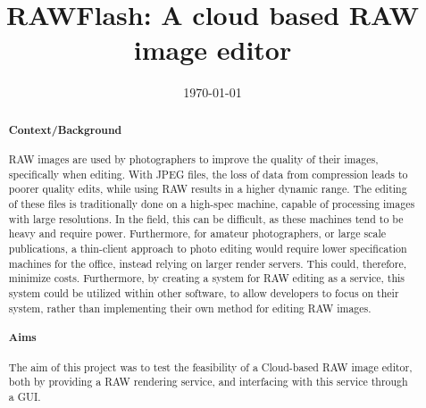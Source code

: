 \documentclass[10pt,a4paper]{article}
\title{RAWFlash: A cloud based RAW image editor}
\author{} %
\date{\today}
\begin{document}
\maketitle

\begin{abstract}

\paragraph{Context/Background}
RAW images are used by photographers to improve the quality of their images, specifically when editing. With JPEG files, the loss of data from compression leads to poorer quality edits, while using RAW results in a higher dynamic range. The editing of these files is traditionally done on a high-spec machine, capable of processing images with large resolutions. In the field, this can be difficult,
as these machines tend to be heavy and require power. Furthermore, for amateur photographers, or large scale publications,
a thin-client approach to photo editing would require lower specification machines for the office, instead relying on larger render
servers. This could, therefore, minimize costs. Furthermore, by creating a system for RAW editing as a service,
this system could be utilized within other software, to allow developers to focus on their system, rather than implementing their own method for editing RAW images.


\paragraph{Aims}
The aim of this project was to test the feasibility of a Cloud-based RAW image editor, both by providing a RAW rendering
service, and interfacing with this service through a GUI.



\end{abstract}
\end{document}
